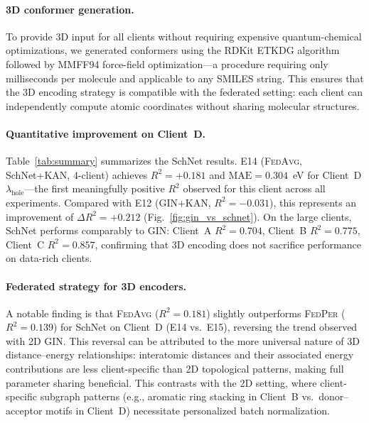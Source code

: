 \documentclass[twocolumn]{article}
\newcommand{\lamhole}{\lambda_{\text{hole}}}
\newcommand{\Rsq}{R^{2}}
\newcommand{\FedPer}{\textsc{FedPer}}
\newcommand{\FedAvg}{\textsc{FedAvg}}
\begin{document}
\paragraph{3D conformer generation.}
To provide 3D input for all clients without requiring expensive quantum-chemical optimizations, we generated conformers using the RDKit ETKDG algorithm~\cite{RDKit2023} followed by MMFF94 force-field optimization---a procedure requiring only milliseconds per molecule and applicable to any SMILES string.
This ensures that the 3D encoding strategy is compatible with the federated setting: each client can independently compute atomic coordinates without sharing molecular structures.

\paragraph{Quantitative improvement on Client~D.}
Table~\ref{tab:summary} summarizes the SchNet results.
E14 (\FedAvg{}, SchNet+KAN, 4-client) achieves $\Rsq = +0.181$ and $\text{MAE} = 0.304$~eV for Client~D $\lamhole$---the first meaningfully positive $\Rsq$ observed for this client across all experiments.
Compared with E12 (GIN+KAN, $\Rsq = -0.031$), this represents an improvement of $\Delta \Rsq = +0.212$ (Fig.~\ref{fig:gin_vs_schnet}).
On the large clients, SchNet performs comparably to GIN: Client~A $\Rsq = 0.704$, Client~B $\Rsq = 0.775$, Client~C $\Rsq = 0.857$, confirming that 3D encoding does not sacrifice performance on data-rich clients.

\paragraph{Federated strategy for 3D encoders.}
A notable finding is that \FedAvg{} ($\Rsq = 0.181$) slightly outperforms \FedPer{} ($\Rsq = 0.139$) for SchNet on Client~D (E14 vs.\ E15), reversing the trend observed with 2D GIN.
This reversal can be attributed to the more universal nature of 3D distance--energy relationships: interatomic distances and their associated energy contributions are less client-specific than 2D topological patterns, making full parameter sharing beneficial.
This contrasts with the 2D setting, where client-specific subgraph patterns (e.g., aromatic ring stacking in Client~B vs.\ donor--acceptor motifs in Client~D) necessitate personalized batch normalization.
\end{document}
